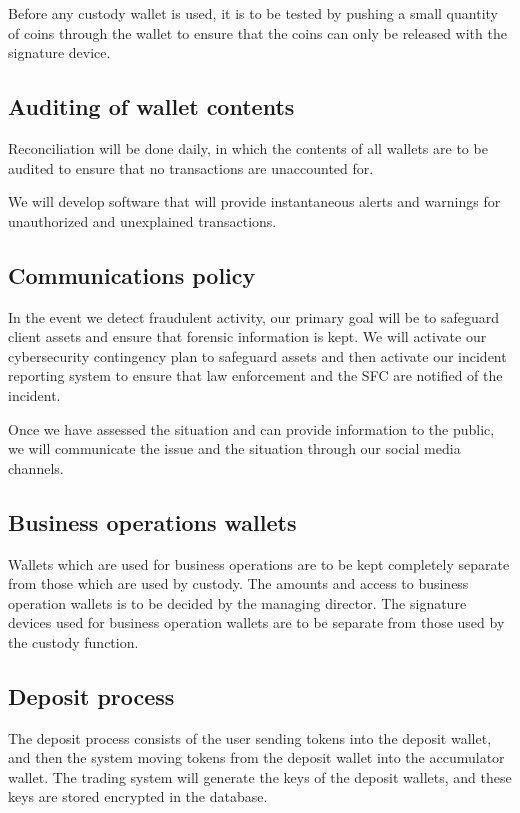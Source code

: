 Before any custody wallet is used, it is to be tested by pushing a
small quantity of coins through the wallet to ensure that the coins can
only be released with the signature device.

\subsection{Auditing of wallet contents}

Reconciliation will be done daily, in which the contents of
all wallets are to be audited to ensure that no transactions are
unaccounted for.

We will develop software that will provide instantaneous alerts and
warnings for unauthorized and unexplained transactions.

\subsection{Communications policy}
In the event we detect fraudulent activity, our primary goal will be to
safeguard client assets and ensure that forensic information is kept.
We will activate our cybersecurity contingency plan to safeguard
assets and then activate our incident reporting system to ensure that
law enforcement and the SFC are notified of the incident.

Once we have assessed the situation and can provide
information to the public, we will communicate the issue and the
situation through our social media channels.

\subsection{Business operations wallets}

Wallets which are used for business operations are to be kept
completely separate from those which are used by custody.  The amounts
and access to business operation wallets is to be decided by the
managing director.  The signature devices used for business operation
wallets are to be separate from those used by the custody function.

\subsection{Deposit process}
The deposit process consists of the user sending tokens into the
deposit wallet, and then the system moving tokens from the deposit
wallet into the accumulator wallet.  The trading system will generate
the keys of the deposit wallets, and these keys are stored encrypted
in the database.

